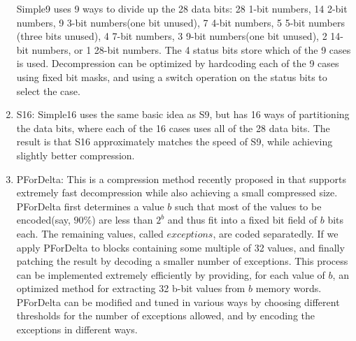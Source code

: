 \begin{enumerate}
Simple9 uses 9 ways to divide up the 28 data bits: 28 1-bit numbers, 14 2-bit numbers, 9 3-bit numbers(one bit unused), 7 4-bit numbers, 5 5-bit numbers
(three bits unused), 4 7-bit numbers, 3 9-bit numbers(one bit unused), 2 14-bit numbers, or 1 28-bit numbers. The 4 status bits store which of the 9 cases
is used. Decompression can be optimized by hardcoding each of the 9 cases using fixed bit masks, and using a switch operation on the status bits to select the case.
 \item S16: Simple16 \cite{zhang2008performance} uses the same basic idea as S9, but has 16 ways of partitioning the data bits, where each of the 16 cases uses 
all of the 28 data bits. The result is that S16 approximately matches the speed of S9, while achieving slightly better compression. 
 \item PForDelta: This is a compression method recently proposed in \cite{zukowski2006ssr} that supports extremely fast decompression while also 
achieving a small compressed size.  PForDelta first determines a value $b$ such that most of the values to be encoded(say, $90\%$) are less than $2^b$ and thus
fit into a fixed bit field of $b$ bits each. The remaining values, called $exceptions$, are coded separatedly.  If we apply PForDelta to blocks containing some multiple
of 32 values, and finally patching the result by decoding a smaller number of exceptions. This process can be implemented extremely efficiently by providing,
for each value of $b$, an optimized method for extracting 32 b-bit values from $b$ memory words. PForDelta can be modified and tuned in various ways by choosing
different thresholds for the number of exceptions allowed, and by encoding the exceptions in different ways.


\end{enumerate}
